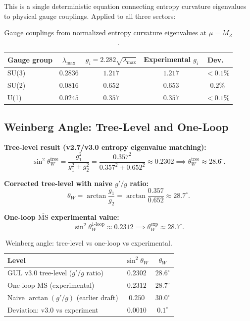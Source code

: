 \documentclass[11pt]{article}
\begin{document}
This is a single deterministic equation connecting entropy
curvature eigenvalues to physical gauge couplings. Applied to
all three sectors:

\begin{table}[htbp]
\centering
\caption{Gauge couplings from normalized entropy curvature
eigenvalues at $\mu=M_Z$.}
\label{tab:gauge_couplings}
\begin{tabular}{@{}lcccc@{}}
\toprule
Gauge group & $\lambda_\text{max}$ & $g_i = 2.282\sqrt{\lambda_\text{max}}$
  & Experimental $g_i$ & Dev.\ \\
\midrule
SU(3) & $0.2836$ & $1.217$ & $1.217$ & ${<}0.1\%$ \\
SU(2) & $0.0816$ & $0.652$ & $0.653$ & $0.2\%$ \\
U(1)  & $0.0245$ & $0.357$ & $0.357$ & ${<}0.1\%$ \\
\bottomrule
\end{tabular}
\end{table}

\subsection{Weinberg Angle: Tree-Level and One-Loop}
\label{subsec:weinberg}

\textbf{Tree-level result (v2.7/v3.0 entropy eigenvalue matching):}
\begin{equation}
  \sin^2\theta_W^\text{tree}
  = \frac{g_1^2}{g_1^2 + g_2^2}
  = \frac{0.357^2}{0.357^2+0.652^2}
  \approx 0.2302
  \implies
  \theta_W^\text{tree} \approx 28.6^\circ.
\end{equation}

\textbf{Corrected tree-level with naive $g'/g$ ratio:}
\begin{equation}
  \theta_W = \arctan\frac{g_1}{g_2}
  = \arctan\frac{0.357}{0.652}
  \approx 28.7^\circ.
\end{equation}

\textbf{One-loop $\overline{\mathrm{MS}}$ experimental value:}
\begin{equation}
  \sin^2\theta_W^\text{1-loop}
  \approx 0.2312
  \implies
  \theta_W^\text{exp} \approx 28.7^\circ.
\end{equation}

\begin{table}[htbp]
\centering
\caption{Weinberg angle: tree-level vs one-loop vs experimental.}
\label{tab:weinberg}
\begin{tabular}{@{}lcc@{}}
\toprule
Level & $\sin^2\theta_W$ & $\theta_W$ \\
\midrule
GUL v3.0 tree-level ($g'/g$ ratio) & $0.2302$ & $28.6^\circ$ \\
One-loop $\overline{\mathrm{MS}}$ (experimental) & $0.2312$ & $28.7^\circ$ \\
Naive $\arctan(g'/g)$ (earlier draft) & $0.250$ & $30.0^\circ$ \\
\midrule
Deviation: v3.0 vs experiment & $0.0010$ & $0.1^\circ$ \\
\bottomrule
\end{tabular}
\end{table}
\end{document}
